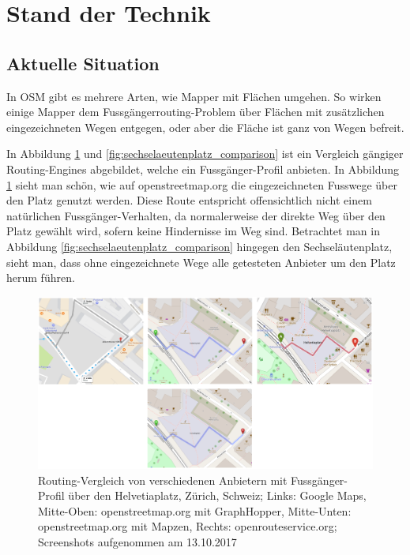 \section{Stand der Technik}
\label{sec:Stand der Technik}

\subsection{Aktuelle Situation}
\label{sub:Aktuelle Situation}

In \ac{OSM} gibt es mehrere Arten, wie Mapper mit Flächen umgehen. So wirken einige Mapper dem Fussgängerrouting-Problem über Flächen mit zusätzlichen eingezeichneten Wegen entgegen, oder aber die Fläche ist ganz von Wegen befreit.

In Abbildung \ref{fig:helvetiaplatz_comparison} und \ref{fig:sechselaeutenplatz_comparison} ist ein Vergleich gängiger Routing-Engines abgebildet, welche ein Fussgänger-Profil anbieten. In Abbildung \ref{fig:helvetiaplatz_comparison} sieht man schön, wie auf openstreetmap.org die eingezeichneten Fusswege über den Platz genutzt werden. Diese Route entspricht offensichtlich nicht einem natürlichen Fussgänger-Verhalten, da normalerweise der direkte Weg über den Platz gewählt wird, sofern keine Hindernisse im Weg sind. Betrachtet man in Abbildung \ref{fig:sechselaeutenplatz_comparison} hingegen den Sechseläutenplatz, sieht man, dass ohne eingezeichnete Wege alle getesteten Anbieter um den Platz herum führen.

\begin{figure}[ht]
\centering
\includegraphics[width=1\linewidth]{technicalreport/img/helvetiaplatz_comparison}
\caption[Fussgänger-Routing Vergleich]{Routing-Vergleich von verschiedenen Anbietern mit Fussgänger-Profil über den Helvetiaplatz, Zürich, Schweiz; Links: Google Maps, Mitte-Oben: openstreetmap.org mit GraphHopper, Mitte-Unten: openstreetmap.org mit Mapzen, Rechts: openrouteservice.org; Screenshots aufgenommen am 13.10.2017}
\label{fig:helvetiaplatz_comparison}
\end{figure}

